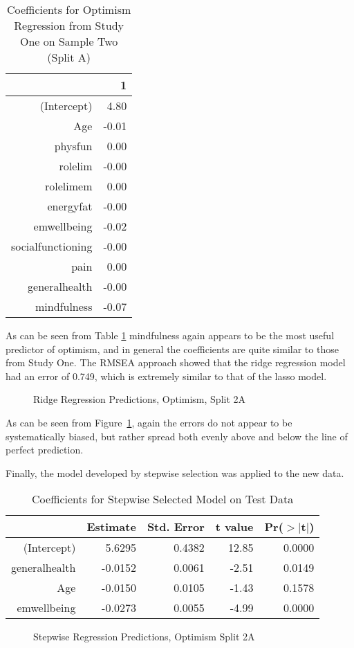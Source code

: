 \documentclass{article}
\begin{document}
\begin{table}[ht]
\centering
\begin{tabular}{rr}
  \hline
 & 1 \\ 
  \hline
(Intercept) & 4.80 \\ 
  Age & -0.01 \\ 
  physfun & 0.00 \\ 
  rolelim & -0.00 \\ 
  rolelimem & 0.00 \\ 
  energyfat & -0.00 \\ 
  emwellbeing & -0.02 \\ 
  socialfunctioning & -0.00 \\ 
  pain & 0.00 \\ 
  generalhealth & -0.00 \\ 
  mindfulness & -0.07 \\ 
   \hline
\end{tabular}
\caption{Coefficients for Optimism Regression from Study One on Sample Two (Split A)} 
\label{tab:homoptridge2a}
\end{table}
As can be seen from Table \ref{tab:homoptridge2a} mindfulness again appears to be the most useful predictor of optimism, and in general the coefficients are quite similar to those from Study One. The RMSEA approach showed that the ridge regression model had an error of 0.749, which is extremely similar to that of the lasso model. 
\begin{figure}
  \caption{Ridge Regression Predictions, Optimism, Split 2A}
  \label{fig:ridgepredplot2a}
\end{figure}


As can be seen from Figure~\ref{fig:ridgepredplot2a}, again the errors do not appear to be systematically biased, but rather spread both evenly above and below the line of perfect prediction. 

Finally, the model developed by stepwise selection was applied to the new data. 

\begin{table}[ht]
\centering
\begin{tabular}{rrrrr}
  \hline
 & Estimate & Std. Error & t value & Pr($>$$|$t$|$) \\ 
  \hline
(Intercept) & 5.6295 & 0.4382 & 12.85 & 0.0000 \\ 
  generalhealth & -0.0152 & 0.0061 & -2.51 & 0.0149 \\ 
  Age & -0.0150 & 0.0105 & -1.43 & 0.1578 \\ 
  emwellbeing & -0.0273 & 0.0055 & -4.99 & 0.0000 \\ 
   \hline
\end{tabular}
\caption{Coefficients for Stepwise Selected Model on Test Data} 
\label{tab:homstepopttest2a}
\end{table}
\begin{figure}
  \caption{Stepwise Regression Predictions, Optimism Split 2A}
  \label{fig:optstepredplot}
\end{figure}
\end{document}
